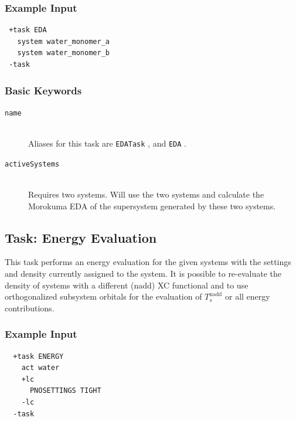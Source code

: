 \documentclass[bibliography=totocnumbered,a4paper,10pt,oneside]{scrbook}
\newcommand{\ttt}[1]{%
  \begingroup\setlength{\fboxsep}{1pt}%
  \colorbox{serenity-green!30}{\texttt{\hspace*{2pt}\vphantom{(g}#1\hspace*{2pt}}}%
  \endgroup
}
\begin{document}
\subsubsection{Example Input}
\begin{lstlisting}
 +task EDA
   system water_monomer_a
   system water_monomer_b
 -task
\end{lstlisting}
\subsubsection{Basic Keywords}
\begin{description}
  \item [\texttt{name}]\hfill \\
    Aliases for this task are \ttt{EDATask},  and \ttt{EDA}.
  \item [\texttt{activeSystems}]\hfill \\
    Requires two systems. Will use the two systems and calculate the Morokuma EDA of the supersystem 
    generated by these two systems.
\end{description}


\subsection{Task: Energy Evaluation}\label{task: energy eval}
This task performs an energy evaluation for the given systems with the settings
and density currently assigned to the system. It is possible to re-evaluate the density
of systems with a different (nadd) XC functional and to use orthogonalized subsystem 
orbitals for the evaluation of $T_s^\text{nadd}$ or all energy contributions.
\subsubsection{Example Input}
\begin{lstlisting}
  +task ENERGY
    act water
    +lc
      PNOSETTINGS TIGHT
    -lc
  -task
\end{lstlisting}
\end{document}
